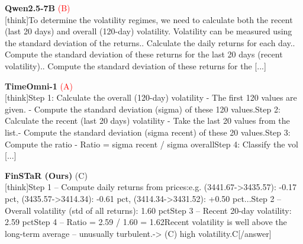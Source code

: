 \noindent
\begin{minipage}[t]{0.28\textwidth}
\colorbox{red!8}{\parbox{\dimexpr\textwidth-2\fboxsep}{
\textbf{Qwen2.5-7B} \textcolor{red}{(B)} \\[2pt]
\tiny
[think]\newline To determine the volatility regimes, we need to calculate both the recent (last 20 days) and overall (120-day) volatility. Volatility can be measured using the standard deviation of the returns.. Calculate the daily returns for each day.. Compute the standard deviation of these returns for the last 20 days (recent volatility).. Compute the standard deviation of these returns for the  [...]
}}
\end{minipage}
\hfill
\begin{minipage}[t]{0.28\textwidth}
\colorbox{red!8}{\parbox{\dimexpr\textwidth-2\fboxsep}{
\textbf{TimeOmni-1} \textcolor{red}{(A)} \\[2pt]
\tiny
[think]\newline Step 1: Calculate the overall (120-day) volatility  \newline - The first 120 values are given.  \newline - Compute the standard deviation (sigma) of these 120 values.\newline Step 2: Calculate the recent (last 20 days) volatility  \newline - Take the last 20 values from the list.\newline - Compute the standard deviation (sigma recent) of these 20 values.\newline Step 3: Compute the ratio  \newline - Ratio = sigma recent / sigma overall\newline Step 4: Classify the vol [...]
}}
\end{minipage}
\hfill
\begin{minipage}[t]{0.41\textwidth}
\colorbox{green!10}{\parbox{\dimexpr\textwidth-2\fboxsep}{
\textbf{FinSTaR (Ours)} \textcolor{green!50!black}{(C)} \\[2pt]
\tiny
[think]\newline Step 1 -- Compute daily returns from prices:\newline   e.g. (3441.67->3435.57): -0.17 pct, (3435.57->3414.34): -0.61 pct, (3414.34->3431.52): +0.50 pct\newline   ...\newline Step 2 -- Overall volatility (std of all returns): 1.60 pct\newline Step 3 -- Recent 20-day volatility: 2.59 pct\newline Step 4 -- Ratio = 2.59 / 1.60 = 1.62\newline Recent volatility is well above the long-term average -- unusually turbulent.\newline -> (C) high volatility.\newline [/think]\newline [answer]C[/answer]
}}
\end{minipage}
\vspace{8pt}


